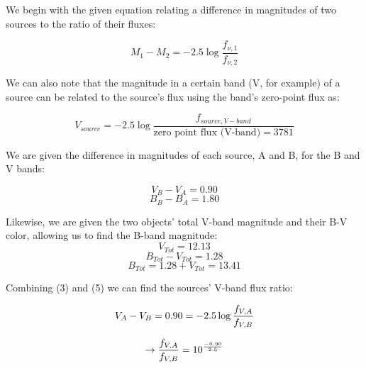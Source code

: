 \documentclass[12pt]{article}
\newenvironment{answer}[2][Answer]{\begin{trivlist}
\item[\hskip \labelsep {\bfseries #1}\hskip \labelsep {\bfseries #2.}]}{\end{trivlist}}
\begin{document}
\begin{answer}{2}

  We begin with the given equation relating a difference in magnitudes of two sources to the ratio of their fluxes:

  \begin{equation}
    M_{1} - M_{2} = -2.5 \log{\frac{f_{\nu,1}}{f_{\nu,2}}}
  \end{equation}

  We can also note that the magnitude in a certain band (V, for example) of a source can be related to the source's flux using the band's zero-point flux as:

  \begin{equation}
    V_{source} = -2.5 \log{\frac{f_{source, V-band}}{\text{zero point flux (V-band)} = 3781}}
  \end{equation}

  We are given the difference in magnitudes of each source, A and B, for the B and V bands:

  \begin{equation}
    V_{B} - V_{A} = 0.90
  \end{equation}
  \begin{equation}
    B_{B} - B_{A} = 1.80
  \end{equation}

  Likewise, we are given the two objects' total V-band magnitude and their B-V color, allowing us to find the B-band magnitude:
  \begin{equation}
    V_{Tot} = 12.13
  \end{equation}
  \begin{equation}
    B_{Tot} - V_{Tot} = 1.28
  \end{equation}
  \begin{equation}
    B_{Tot} = 1.28 + V_{Tot} = 13.41
  \end{equation}


  Combining (3) and (5) we can find the sources' V-band flux ratio:

  \begin{equation}
    V_{A} - V_{B} = 0.90 = -2.5 \log{\frac{f_{V,A}}{f_{V,B}}} \\
  \end{equation}

  $$  \rightarrow \frac{f_{V,A}}{f_{V,B}} = 10^{\frac{-0.90}{2.5}} \\ $$


\end{answer}
\end{document}
